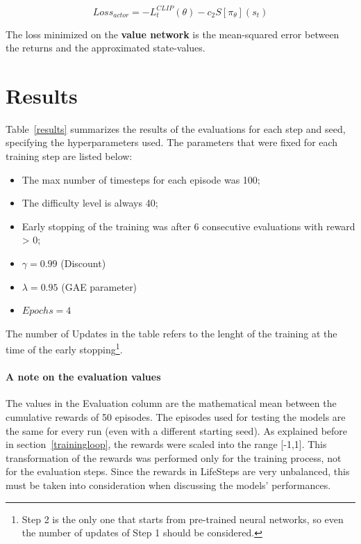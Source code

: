 \documentclass{article}
\begin{document}
\begin{displaymath}
    Loss_{actor} = -L_t^{CLIP}(\theta) - c_2 S[\pi_\theta](s_t)
\end{displaymath}

The loss minimized on the \textbf{value network} is the mean-squared error between the returns and the approximated state-values.


\section{Results}
Table~\ref{results} summarizes the results of the evaluations for each step and seed, specifying the hyperparameters used. The parameters that were fixed for each training step are listed below:

\begin{itemize}
    \item The max number of timesteps for each episode was 100;
    \item The difficulty level is always 40;
    \item Early stopping of the training was after 6 consecutive evaluations with reward > 0;
    \item \(\gamma = 0.99\) (Discount)
    \item \(\lambda = 0.95\) (GAE parameter)
    \item \(Epochs = 4\)
\end{itemize}

The number of Updates in the table refers to the lenght of the training at the time of the early stopping\footnote{Step 2 is the only one that starts from pre-trained neural networks, so even the number of updates of Step 1 should be considered.}.

\paragraph{A note on the evaluation values}
The values in the Evaluation column are the mathematical mean between the cumulative rewards of 50 episodes. The episodes used for testing the models are the same for every run (even with a different starting seed).
As explained before in section~\ref{trainingloop}, the rewards were scaled into the range [-1,1]. This transformation of the rewards was performed only for the training process, not for the evaluation steps. Since the rewards in LifeSteps are very unbalanced, this must be taken into consideration when discussing the models' performances. 
\end{document}
